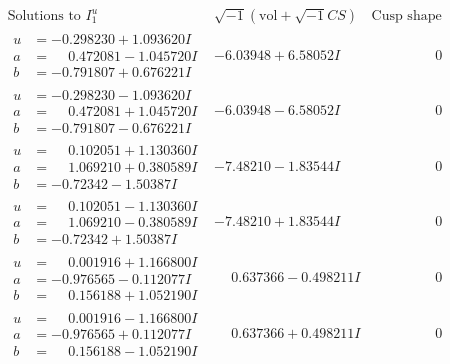 \documentclass[1p]{elsarticle_modified}
\theoremstyle{definition}
\newcommand{\I}{\sqrt{-1}}
\begin{document}
$$\begin{array}{c|c|c}  
\text{Solutions to }I^u_{1}& \I (\text{vol} + \sqrt{-1}CS) & \text{Cusp shape}\\
 \hline 
\begin{aligned}
u &= -0.298230 + 1.093620 I \\
a &= \phantom{-}0.472081 - 1.045720 I \\
b &= -0.791807 + 0.676221 I\end{aligned}
 & -6.03948 + 6.58052 I & \phantom{-0.000000 } 0 \\ \hline\begin{aligned}
u &= -0.298230 - 1.093620 I \\
a &= \phantom{-}0.472081 + 1.045720 I \\
b &= -0.791807 - 0.676221 I\end{aligned}
 & -6.03948 - 6.58052 I & \phantom{-0.000000 } 0 \\ \hline\begin{aligned}
u &= \phantom{-}0.102051 + 1.130360 I \\
a &= \phantom{-}1.069210 + 0.380589 I \\
b &= -0.72342 - 1.50387 I\end{aligned}
 & -7.48210 - 1.83544 I & \phantom{-0.000000 } 0 \\ \hline\begin{aligned}
u &= \phantom{-}0.102051 - 1.130360 I \\
a &= \phantom{-}1.069210 - 0.380589 I \\
b &= -0.72342 + 1.50387 I\end{aligned}
 & -7.48210 + 1.83544 I & \phantom{-0.000000 } 0 \\ \hline\begin{aligned}
u &= \phantom{-}0.001916 + 1.166800 I \\
a &= -0.976565 - 0.112077 I \\
b &= \phantom{-}0.156188 + 1.052190 I\end{aligned}
 & \phantom{-}0.637366 - 0.498211 I & \phantom{-0.000000 } 0 \\ \hline\begin{aligned}
u &= \phantom{-}0.001916 - 1.166800 I \\
a &= -0.976565 + 0.112077 I \\
b &= \phantom{-}0.156188 - 1.052190 I\end{aligned}
 & \phantom{-}0.637366 + 0.498211 I & \phantom{-0.000000 } 0 \\ \hline\begin{aligned}

\end{aligned}
\end{array}$$
\end{document}
